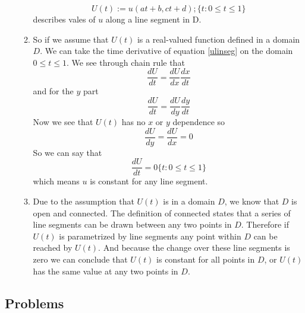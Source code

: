 \documentclass[11pt]{article}
\begin{document}
\begin{enumerate}
\begin{enumerate}
\begin{equation}
U(t) := u(at +b, ct +d); \{t:0\le t\le 1\}
\label{ulinseg}
\end{equation}
describes vales of $u$ along a line segment in D.
\item 
So if we assume that $U(t)$ is a real-valued function defined in a domain $D$. We can take the time derivative of equation \ref{ulinseg} on the domain $0 \le t \le 1$. We see through chain rule that
$$\frac{dU}{dt} = \frac{dU}{dx}\frac{dx}{dt}$$
and for the $y$ part
$$\frac{dU}{dt} = \frac{dU}{dy}\frac{dy}{dt}$$
Now we see that $U(t)$ has no $x$ or $y$ dependence so
$$\frac{dU}{dy} = \frac{dU}{dx} = 0$$
So we can say that
$$\frac{dU}{dt} = 0 \{t:0\le t\le1\}$$ which means $u$ is constant for any line segment.

\item
Due to the assumption that $U(t)$ is in a domain $D$, we know that $D$ is open and connected. The definition of connected states that a series of line segments can be drawn between any two points in $D$. Therefore if $U(t)$ is parametrized by line segments any point within $D$ can be reached by $U(t)$. And because the change over these line segments is zero we can conclude that $U(t)$ is constant for all points in $D$, or $U(t)$ has the same value at any two points in $D$.
\end{enumerate}
\end{enumerate}

\subsection*{Problems}
\end{document}
